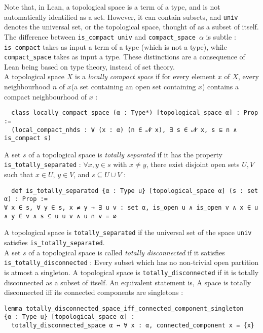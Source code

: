 \documentclass[a4paper,UKenglish,cleveref, autoref, thm-restate]{lipics-v2021}
\newcommand{\lean}[1]{\texttt{#1}\xspace} %
\begin{document}
Note that, in Lean, a topological space is a term of a type, and is not automatically identified as a 
set. However, it can contain subsets, and \lean{univ} denotes the universal set, or the topological space, 
thought of as a subset of itself. The difference between \lean{is\_compact univ} and \lean{compact\_space $\alpha$} is subtle : 
\lean{is\_compact} takes as input a term of a type (which is not a type), while \lean{compact\_space} 
takes as input a type. These distinctions are a consequence of Lean being based on type theory, instead of set theory. \\

A topological space $X$ is a \textit{locally compact space} if  for every element $x$ of $X$, 
every neighbourhood $n$ of $x$(a set containing an open set containing $x$) contains a compact 
neighbourhood of $x$ :
\begin{lstlisting}
  class locally_compact_space (α : Type*) [topological_space α] : Prop := 
  (local_compact_nhds : ∀ (x : α) (n ∈ 𝓝 x), ∃ s ∈ 𝓝 x, s ⊆ n ∧ is_compact s)
\end{lstlisting}

A set $s$ of a topological space is \textit{totally separated} if it has the property \lean{is\_totally\_separated} : 
$\forall x, y \in s$ with $x \ne y$, there exist disjoint open sets $U, V$ such that $x \in U$, $y \in V$, and
$s \subseteq U \cup V$ : 
\begin{lstlisting}
  def is_totally_separated {α : Type u} [topological_space α] (s : set α) : Prop :=
∀ x ∈ s, ∀ y ∈ s, x ≠ y → ∃ u v : set α, is_open u ∧ is_open v ∧ x ∈ u ∧ y ∈ v ∧ s ⊆ u ∪ v ∧ u ∩ v = ∅
\end{lstlisting}
A topological space is \lean{totally\_separated} if the universal set of the space \lean{univ} 
satisfies \lean{is\_totally\_separated}. \\
A set $s$ of a topological space is called \textit{totally disconnected} if it satisfies \lean{is\_totally\_disconnected} : 
Every subset which has no non-trivial open partition is atmost a singleton. A topological space is \lean{totally\_disconnected} if it is
totally disconnected as a subset of itself. An equivalent statement is, A space is totally disconnected iff its connected components are singletons :
\begin{lstlisting}
lemma totally_disconnected_space_iff_connected_component_singleton 
{α : Type u} [topological_space α] :
  totally_disconnected_space α ↔ ∀ x : α, connected_component x = {x}
\end{lstlisting} 
\end{document}
